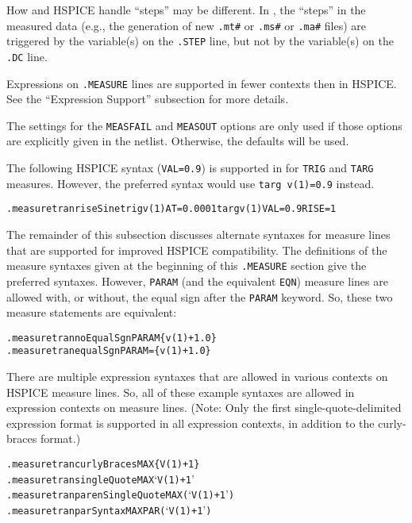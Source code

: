 \begin{XyceItemize}
  \item How \Xyce{} and HSPICE handle ``steps'' may be different.
        In \Xyce{}, the ``steps'' in the measured data (e.g., the
        generation of new \texttt{.mt\#} or \texttt{.ms\#}
        or \texttt{.ma\#} files) are triggered by the variable(s) on
        the {\tt .STEP} line, but not by the variable(s) on the {\tt
        .DC} line.

  \item Expressions on \texttt{.MEASURE} lines are supported in fewer
        contexts then in HSPICE.  See the ``Expression Support''
        subsection for more details.

  \item The settings for the \texttt{MEASFAIL} and \texttt{MEASOUT}
        options are only used if those options are explicitly given in
        the netlist.  Otherwise, the \Xyce{} defaults will be used.
\end{XyceItemize}

The following HSPICE syntax ({\tt VAL=0.9}) is supported in \Xyce{}
for {\tt TRIG} and {\tt TARG} measures. However, the preferred \Xyce{}
syntax would use {\tt targ v(1)=0.9} instead.
\begin{alltt}
.measure tran riseSine trig v(1) AT=0.0001 targ v(1) VAL=0.9 RISE=1
\end{alltt}

The remainder of this subsection discusses alternate syntaxes
for \Xyce{} measure lines that are supported for improved HSPICE
compatibility.  The definitions of the measure syntaxes given at the
beginning of this \texttt{.MEASURE} section give the preferred
\Xyce{} syntaxes.  However, \texttt{PARAM} (and the equivalent \texttt{EQN})
measure lines are allowed with, or without, the equal sign after
the \texttt{PARAM} keyword.  So, these two \Xyce{} measure statements
are equivalent:
\begin{alltt}
.measure tran noEqualSgn PARAM \{v(1)+1.0\}
.measure tran equalSgn PARAM=\{v(1)+1.0\}
\end{alltt}

There are multiple expression syntaxes that are allowed in various
contexts on HSPICE measure lines.  So, all of these example syntaxes
are allowed in expression contexts on \Xyce{} measure lines.  (Note:
Only the first single-quote-delimited expression format is supported
in all \Xyce{} expression contexts, in addition to the \Xyce{}
curly-braces format.)
\begin{alltt}
.measure tran curlyBraces MAX \{V(1)+1\}
.measure tran singleQuote MAX `V(1)+1'
.measure tran parenSingleQuote MAX (`V(1)+1')
.measure tran parSyntax MAX PAR(`V(1)+1')
\end{alltt}

